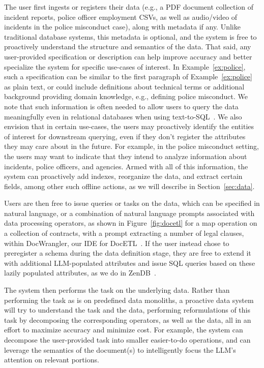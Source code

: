 The user first ingests
or registers their data (e.g.,
a PDF document collection of incident reports, police officer employment CSVs,
as well as audio/video of incidents 
in the police misconduct case),
along with metadata if any.
Unlike traditional database systems,
this metadata is optional,
and the system
is free to proactively understand the 
structure and semantics of the data.
That said, any 
user-provided specification or description
can help improve
accuracy and better specialize the
system for specific use-cases
of interest.
In Example~\ref{ex:police}, 
such a specification can be similar to 
the first paragraph of Example~\ref{ex:police} as plain text, 
or could include definitions about technical terms or
additional background providing domain knowledge,
e.g., defining police misconduct. 
We note that such information is often needed to allow 
users to query the data meaningfully 
even in relational databases
when using text-to-SQL~\cite{li2024can}. 
We also envision that
in certain use-cases, the users
may proactively identify the entities
of interest for downstream querying,
even if they don't register
the attributes they may care about in the future.
For example, in the police misconduct setting,
the users may want to indicate
that they intend to analyze information
about incidents, police officers,
and agencies.
Armed with all of this information, 
the system
can proactively add indexes,
reorganize the data, 
and extract
certain fields,
among other such offline actions,
as we will describe in Section~\ref{sec:data}.

Users are then free
to issue queries or tasks on the data,
which can be specified
in natural language,
or a combination of natural language prompts
associated with data processing operators,
as shown in Figure~\ref{fig:docetl}
for a map operation on a collection of contracts,
with a prompt
extracting a number of legal clauses,
within DocWrangler, our IDE for DocETL~\cite{shankar2024docetl}.
If the user instead chose to preregister
a schema during the data definition
stage, they are free
to extend it with additional
LLM-populated attributes
and issue SQL queries
based on these lazily populated attributes,
as we do in ZenDB~\cite{lin2024towards}.

The system then performs the task on the underlying data.
Rather than performing the task
as is on predefined data monoliths,
a proactive data system
will try to understand
the task and the data,
performing reformulations
of this task by decomposing 
the corresponding operators,
as well as the data,
all in an effort to maximize
accuracy and minimize cost.
For example, the system can decompose 
the user-provided task 
into smaller easier-to-do operations, 
and can leverage the semantics of the document(s) 
to intelligently focus the LLM's attention on 
relevant portions. 


